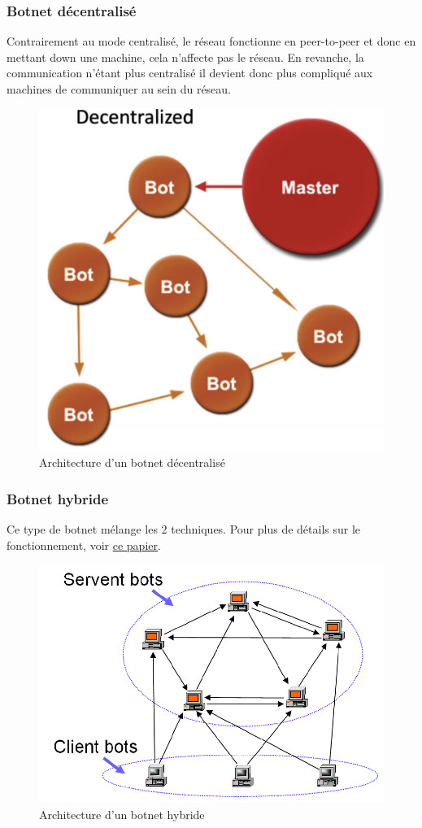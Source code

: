 \documentclass[12pt, oneside]{article}
\begin{document}
\subsubsection{Botnet décentralisé}
Contrairement au mode centralisé, le réseau fonctionne en peer-to-peer et donc en mettant down une machine, cela n'affecte pas le réseau. En revanche, la communication n'étant plus centralisé il devient donc plus compliqué aux machines de communiquer au sein du réseau.
\begin{figure}[H]
\centering
\includegraphics[scale=0.3]{decentralized}
\caption{Architecture d'un botnet décentralisé}
\end{figure}

\subsubsection{Botnet hybride}
Ce type de botnet mélange les 2 techniques. Pour plus de détails sur le fonctionnement, voir \href{https://www.usenix.org/legacy/event/hotbots07/tech/full_papers/wang/wang_html/}{ce papier}.
\begin{figure}[H]
\centering
\includegraphics[scale=0.3]{hybrid}
\caption{Architecture d'un botnet hybride}
\end{figure}
\end{document}
